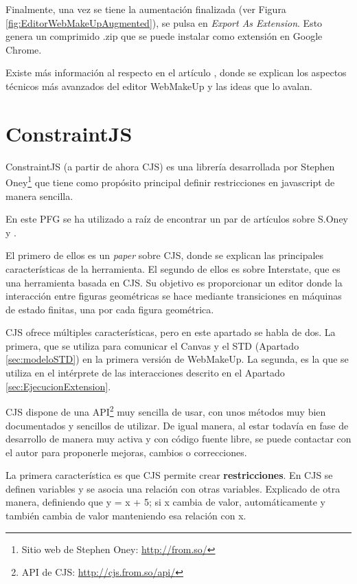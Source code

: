 Finalmente, una vez se tiene la aumentación finalizada (ver Figura \ref{fig:EditorWebMakeUpAugmented}), se pulsa en \emph{Export As Extension}. Esto genera un comprimido .zip que se puede instalar como extensión en Google Chrome.

Existe más información al respecto en el artículo \cite{WISEWebMakeUp}, donde se explican los aspectos técnicos más avanzados del editor WebMakeUp y las ideas que lo avalan.

\chapter{ConstraintJS}
\label{sec:CJS}

ConstraintJS (a partir de ahora CJS) es una librería desarrollada por Stephen Oney\footnote{Sitio web de Stephen Oney: \url{http://from.so/}} que tiene como propósito principal definir restricciones en javascript de manera sencilla.

En este PFG se ha utilizado a raíz de encontrar un par de artículos sobre S.Oney \cite{Oney:2012:CPI:2380116.2380146} y 
\cite{InterState}.

El primero de ellos es un \emph{paper} sobre CJS, donde se explican las principales características de la herramienta. El segundo de ellos es sobre Interstate, que es una herramienta basada en CJS. Su objetivo es proporcionar un editor donde la interacción entre figuras geométricas se hace mediante transiciones en máquinas de estado finitas, una por cada figura geométrica.

CJS ofrece múltiples características, pero en este apartado se habla de dos. La primera, que se utiliza para comunicar el Canvas y el STD (Apartado \ref{sec:modeloSTD}) en la primera versión de WebMakeUp. La segunda, es la que se utiliza en el intérprete de las interacciones descrito en el Apartado \ref{sec:EjecucionExtension}.

CJS dispone de una API\footnote{API de CJS: \url{http://cjs.from.so/api/}} muy sencilla de usar, con unos métodos muy bien documentados y sencillos de utilizar. De igual manera, al estar todavía en fase de desarrollo de manera muy activa y con código fuente libre, se puede contactar con el autor para proponerle mejoras, cambios o correcciones.

La primera característica es que CJS permite crear \textbf{restricciones}. En CJS se definen variables y se asocia una relación con otras variables. Explicado de otra manera, definiendo que y = x + 5; si x cambia de valor, automáticamente y también cambia de valor manteniendo esa relación con x.

